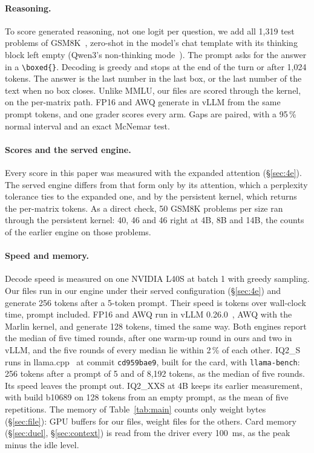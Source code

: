 \paragraph{Reasoning.} To score generated reasoning, not one logit per
question, we add all 1{,}319 test problems of GSM8K~\citep{gsm8k2021},
zero-shot in the model's chat template with its thinking block left empty
(Qwen3's non-thinking mode~\citep{qwen3_2025}). The prompt asks for the answer
in a \texttt{\textbackslash{}boxed\{\}}. Decoding is greedy and stops at the
end of the turn or after 1{,}024 tokens. The answer is the last number in the
last box, or the last number of the text when no box closes. Unlike MMLU, our
files are scored through the kernel, on the per-matrix path. FP16 and AWQ generate in vLLM from
the same prompt tokens, and one grader scores every arm. Gaps are paired, with
a 95\,\% normal interval and an exact McNemar test.

\paragraph{Scores and the served engine.} Every score in this paper was
measured with the expanded attention (\S\ref{sec:4e}). The served engine
differs from that form only by its attention, which a perplexity tolerance
ties to the expanded one, and by the persistent kernel, which returns the per-matrix
tokens. As a direct check, 50 GSM8K problems per size ran through the
persistent kernel: 40, 46 and 46 right at 4B, 8B and 14B, the counts of the
earlier engine on those problems.

\paragraph{Speed and memory.} Decode speed is measured on one NVIDIA L40S at
batch 1 with greedy sampling. Our files run in our engine under their served
configuration (\S\ref{sec:4e}) and generate 256 tokens after a 5-token prompt.
Their speed is tokens over wall-clock time, prompt included. FP16 and AWQ run
in vLLM 0.26.0~\citep{vllm2023}, AWQ with the Marlin kernel, and generate 128
tokens, timed the same way. Both engines report the median of five timed
rounds, after one warm-up round in ours and two in vLLM, and the five rounds
of every median lie within 2\,\% of each other. IQ2\_S runs in
llama.cpp~\citep{llamacpp} at commit \texttt{cd959bae9}, built for the card,
with \texttt{llama-bench}: 256 tokens after a prompt of 5 and of 8{,}192
tokens, as the median of five rounds. Its speed leaves the prompt out.
IQ2\_XXS at 4B keeps its earlier measurement, with build b10689 on 128 tokens
from an empty prompt, as the mean of five repetitions. The memory of
Table~\ref{tab:main} counts only weight bytes (\S\ref{sec:file}): GPU buffers
for our files, weight files for the others. Card memory
(\S\ref{sec:duel}, \S\ref{sec:context}) is read from the driver every 100~ms,
as the peak minus the idle level.

